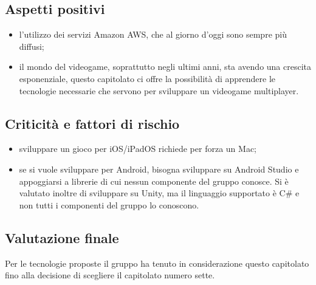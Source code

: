\subsection{Aspetti positivi}
\begin{itemize}
\item l'utilizzo dei servizi Amazon AWS, che al giorno d'oggi sono sempre più diffusi;
\item il mondo del videogame, soprattutto negli ultimi anni, sta avendo una crescita esponenziale, questo capitolato ci offre la possibilità di apprendere le tecnologie necessarie che servono per sviluppare un videogame multiplayer.
\end{itemize}

\subsection{Criticità e fattori di rischio}
\begin{itemize}
\item sviluppare un gioco per iOS/iPadOS richiede per forza un Mac;
\item se si vuole sviluppare per Android, bisogna sviluppare su Android Studio e appoggiarsi a librerie di cui nessun componente del gruppo conosce. 
Si è valutato inoltre di sviluppare su Unity, ma il linguaggio supportato è C\# e non tutti i componenti del gruppo lo conoscono.
\end{itemize}

\subsection{Valutazione finale}
Per le tecnologie proposte il gruppo \textit{\Gruppo{}} ha tenuto in considerazione questo capitolato fino alla decisione di scegliere il capitolato numero sette.